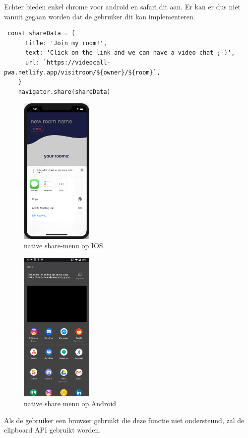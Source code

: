 		Echter bieden enkel chrome voor android en safari dit aan. Er kan er dus niet vanuit gegaan worden dat de gebruiker dit kan implementeren.

\begin{lstlisting}
 const shareData = {
      title: 'Join my room!',
      text: 'Click on the link and we can have a video chat ;-)',
      url: `https://videocall-pwa.netlify.app/visitroom/${owner}/${room}`,
    }
    navigator.share(shareData)
\end{lstlisting}

		\begin{figure}[H]
			\centering
			\includegraphics[width=35mm]{./img/share-ios}{}
			\caption{native share-menu op IOS}
		\end{figure}	\begin{figure}[H]
			\centering
			\includegraphics[width=35mm]{./img/share-android.jpg}{}
			\caption{native share menu op Android}
		\end{figure}

		Als de gebruiker een browser gebruikt die deze functie niet ondersteund, zal de clipboard API gebruikt worden.
	
